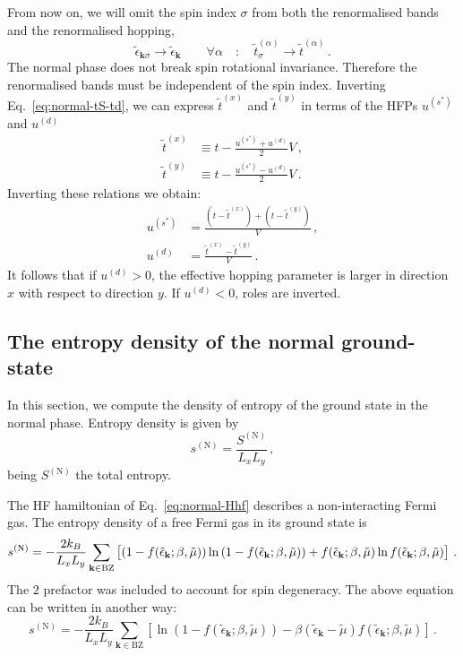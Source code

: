 From now on, we will omit the spin index $\sigma$ from both the renormalised bands and the renormalised hopping,
\[
	\tilde{\epsilon}_{\mathbf{k}\sigma} \to \tilde{\epsilon}_\mathbf{k}
	\qquad
	\forall \alpha
	\quad\colon\quad
	\tilde{t}_\sigma^{(\alpha)} \to \tilde{t}^{(\alpha)} \, .
\]
The normal phase does not break spin rotational invariance. Therefore the renormalised bands must be independent of the spin index. Inverting Eq.~\eqref{eq:normal-tS-td}, we can
express $\tilde{t}^{(x)}$ and $\tilde{t}^{(y)}$ in terms of the HFPs $u^{(s^*)}$ and $u^{(d)}$
\[
\begin{aligned}
	\tilde{t}^{(x)} &\equiv t - \frac{u^{(s^*)} + u^{(d)}}{2} V \, , \\
	\tilde{t}^{(y)} &\equiv t - \frac{u^{(s^*)} - u^{(d)}}{2} V \, .
\end{aligned}
\]
Inverting these relations we obtain:
\begin{align}
	u^{(s^*)} &= \frac{
		\left(
		t-\tilde{t}^{(x)}
		\right) + \left(
		t-\tilde{t}^{(y)}
		\right)
	}{V} \, , \label{eq:normal-us*(tx,ty)}
	\\
	u^{(d)} &= \frac{\tilde{t}^{(x)} - \tilde{t}^{(y)}}{V} \, . \label{eq:normal-ud(tx,ty)}
\end{align}
It follows that if $u^{(d)}>0$, the effective hopping parameter is larger in direction $x$ with respect to direction $y$. If $u^{(d)}<0$, roles are inverted.

\subsection{The entropy density of the normal ground-state}\label{subsec:normal-s}

In this section, we compute the density of entropy of the ground state in the normal phase. Entropy density is given by
\[
	s^{(\mathrm{N})} = \frac{S^{(\mathrm{N})}}{L_x L_y} \, ,
\]
being $S^{(\mathrm{N})}$ the total entropy.

The HF hamiltonian of Eq.~\eqref{eq:normal-Hhf} describes a non-interacting Fermi gas. The entropy density of a free Fermi gas in its ground state \cite{grosso2014solid} is
\begin{equation}\label{eq:normal-s}
	s^{(\mathrm{N})} = -\frac{2k_B}{L_x L_y} \sum_{\mathbf{k}\in\mathrm{BZ}} \left[
		\left(
			1- f(\tilde{\epsilon}_\mathbf{k}; \beta,\tilde{\mu})
		\right) \ln \left(
			1-f( \tilde{\epsilon}_\mathbf{k}; \beta,\tilde{\mu})
		\right) + f(
			\tilde{\epsilon}_\mathbf{k}; \beta,\tilde{\mu})
			\ln f( \tilde{\epsilon}_\mathbf{k}; \beta,\tilde{\mu})
		\vphantom{A^A}
	\right] \, .
\end{equation}
The $2$ prefactor was included to account for spin degeneracy. The above equation can be written in another way:
\begin{equation}\label{eq:normal-s-variant}
		s^{(\mathrm{N})} = -\frac{2k_B}{L_x L_y} \sum_{\mathbf{k}\in\mathrm{BZ}} \left[ \ln \left(
		1-f( \tilde{\epsilon}_\mathbf{k}; \beta,\tilde{\mu}) \right)
		- \beta  (\tilde{\epsilon}_\mathbf{k}-\tilde{\mu}) f( \tilde{\epsilon}_\mathbf{k}; \beta,\tilde{\mu}) 
	\right] \, .
\end{equation}

